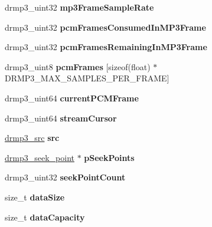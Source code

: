 \begin{DoxyCompactItemize}
\mbox{\label{structdrmp3_ade76fd0c402a551a22c0a06a0b8eb5dc}} 
drmp3\+\_\+uint32 {\bfseries mp3\+Frame\+Sample\+Rate}
\item 
\mbox{\label{structdrmp3_a57052dc84770d6a2789b40388101af39}} 
drmp3\+\_\+uint32 {\bfseries pcm\+Frames\+Consumed\+In\+M\+P3\+Frame}
\item 
\mbox{\label{structdrmp3_ae3017f4bdc17a2df39c4f635bbc875d6}} 
drmp3\+\_\+uint32 {\bfseries pcm\+Frames\+Remaining\+In\+M\+P3\+Frame}
\item 
\mbox{\label{structdrmp3_aab662efd612811b662d0dec87233e4f2}} 
drmp3\+\_\+uint8 {\bfseries pcm\+Frames} \mbox{[}sizeof(float) $\ast$D\+R\+M\+P3\+\_\+\+M\+A\+X\+\_\+\+S\+A\+M\+P\+L\+E\+S\+\_\+\+P\+E\+R\+\_\+\+F\+R\+A\+ME\mbox{]}
\item 
\mbox{\label{structdrmp3_a6500ce0ed15aa4b63622ca9f10b8011e}} 
drmp3\+\_\+uint64 {\bfseries current\+P\+C\+M\+Frame}
\item 
\mbox{\label{structdrmp3_a89971e4af6f62c59f99a1c908690efe3}} 
drmp3\+\_\+uint64 {\bfseries stream\+Cursor}
\item 
\mbox{\label{structdrmp3_abca1d417df91139e0973195b23c8b1e7}} 
\mbox{\hyperlink{structdrmp3__src}{drmp3\+\_\+src}} {\bfseries src}
\item 
\mbox{\label{structdrmp3_ae13ed70982604f33706b9f4a3fd40e76}} 
\mbox{\hyperlink{structdrmp3__seek__point}{drmp3\+\_\+seek\+\_\+point}} $\ast$ {\bfseries p\+Seek\+Points}
\item 
\mbox{\label{structdrmp3_ae9095cc4be150c2ed98c9a4f53041f19}} 
drmp3\+\_\+uint32 {\bfseries seek\+Point\+Count}
\item 
\mbox{\label{structdrmp3_ad1d4cb4cb6209977963313a27f34c3bd}} 
size\+\_\+t {\bfseries data\+Size}
\item 
\mbox{\label{structdrmp3_ac76c099fa2b2d5746a53114cdcb2404d}} 
size\+\_\+t {\bfseries data\+Capacity}
\item 

\end{DoxyCompactItemize}
